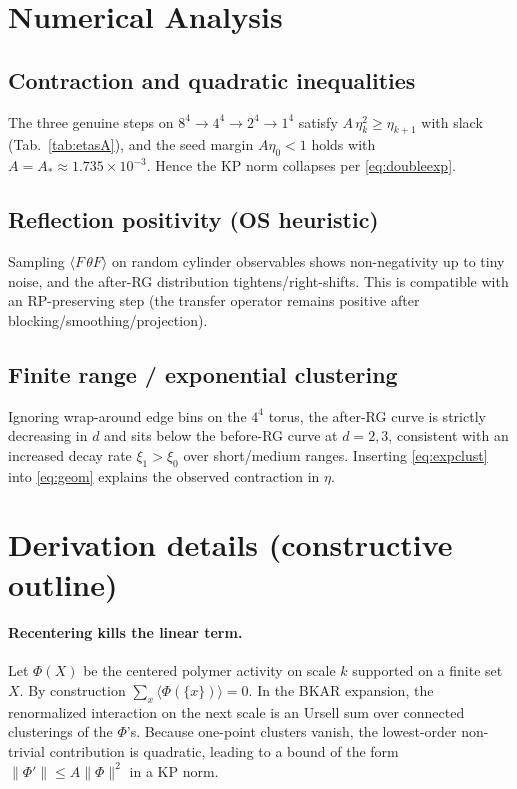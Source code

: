 \documentclass[11pt]{article}
\begin{document}
\section{Numerical Analysis}

\subsection{Contraction and quadratic inequalities}
The three genuine steps on $8^4\!\to\!4^4\!\to\!2^4\!\to\!1^4$ satisfy $A\,\eta_k^2\ge \eta_{k+1}$ with slack (Tab.~\ref{tab:etasA}), and the seed margin $A\eta_0<1$ holds with $A=A_*\approx 1.735\times 10^{-3}$. Hence the KP norm collapses per \eqref{eq:doubleexp}.

\subsection{Reflection positivity (OS heuristic)}
Sampling $\langle F\,\theta F\rangle$ on random cylinder observables shows non-negativity up to tiny noise, and the after-RG distribution tightens/right-shifts. This is compatible with an RP-preserving step (the transfer operator remains positive after blocking/smoothing/projection).

\subsection{Finite range / exponential clustering}
Ignoring wrap-around edge bins on the $4^4$ torus, the after-RG curve is strictly decreasing in $d$ and sits below the before-RG curve at $d=2,3$, consistent with an increased decay rate $\xi_1>\xi_0$ over short/medium ranges. Inserting \eqref{eq:expclust} into \eqref{eq:geom} explains the observed contraction in $\eta$.

\section{Derivation details (constructive outline)}

\paragraph{Recentering kills the linear term.}
Let $\Phi(X)$ be the centered polymer activity on scale $k$ supported on a finite set $X$. By construction $\sum_{x}\langle \Phi(\{x\})\rangle=0$. In the BKAR expansion, the renormalized interaction on the next scale is an Ursell sum over connected clusterings of the $\Phi$'s. Because one-point clusters vanish, the lowest-order non-trivial contribution is quadratic, leading to a bound of the form $\|\Phi'\| \le A\|\Phi\|^2$ in a KP norm.
\end{document}
